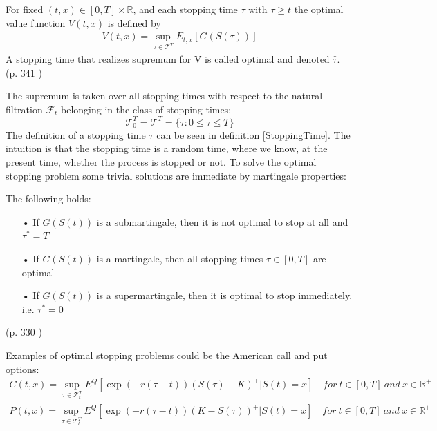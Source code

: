 \theoremstyle{definition}
\begin{definition}{}\label{optValFunc}
For fixed $(t,x)\in [0,T] \times \mathbb{R}$, and each stopping time $\tau$ with $\tau\geq t$ the optimal value function $V(t,x)$ is defined by
\begin{align*}
V(t,x)= \sup_{\tau \in \mathcal{T}^T} E_{t,x}[G(S(\tau))]
\end{align*}
A stopping time that realizes supremum for V is called optimal and denoted $\hat{\tau}$.
\\ \null \hfill (p. 341 \parencite{finKont})
\end{definition}

The supremum is taken over all stopping times with respect to the natural filtration $\mathcal{F}_{t}$ belonging in the class of stopping times:
$$\mathcal{T}_0^T=\mathcal{T}^T=\{\tau : 0 \leq \tau \leq T \}$$
The definition of a stopping time $\tau$ can be seen in definition \ref{StoppingTime}. The intuition is that the stopping time is a random time, where we know, at the present time, whether the process is stopped or not. To solve the optimal stopping problem some trivial solutions are immediate by martingale properties:
\begin{proposition}\label{TrivialMG}
The following holds:
\begin{enumerate}
\item[•] If $G(S(t))$ is a submartingale, then it is not optimal to stop at all and $\tau^*=T$
\item[•] If $G(S(t))$ is a martingale, then all stopping times $\tau\in [0,T]$ are optimal
\item[•] If $G(S(t))$ is a supermartingale, then it is optimal to stop immediately. i.e. $\tau^*=0$
\end{enumerate}
\null \hfill(p. 330 \parencite{finKont})
\end{proposition}

Examples of optimal stopping problems could be the American call and put options:
\begin{align*}
C(t,x)=\sup_{\tau \in \mathcal{T}_t^T} E^Q[\exp(-r(\tau-t)) (S(\tau)-K)^+|S(t)=x] \quad for \ t\in [0,T] \ and \ x\in\mathbb{R}^+\\
P(t,x)=\sup_{\tau \in \mathcal{T}_t^T} E^Q[\exp(-r(\tau-t)) (K-S(\tau))^+|S(t)=x] \quad for \ t\in [0,T] \ and \ x\in\mathbb{R}^+
\end{align*}


